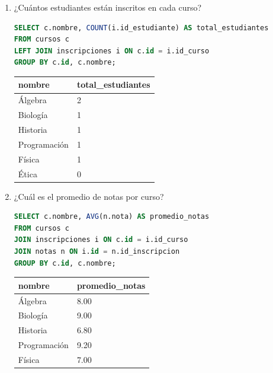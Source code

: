 \documentclass[12pt,letterpaper]{article}
\begin{document}
\begin{enumerate}
    \item ¿Cuántos estudiantes están inscritos en cada curso?
\begin{lstlisting}[language=SQL, frame=single]
SELECT c.nombre, COUNT(i.id_estudiante) AS total_estudiantes 
FROM cursos c 
LEFT JOIN inscripciones i ON c.id = i.id_curso 
GROUP BY c.id, c.nombre;
\end{lstlisting}
    \begin{table}[H]
        \centering
        \begin{tabular}{|l|l|}
        \hline
        \textbf{nombre} & \textbf{total\_estudiantes} \\ \hline
        Álgebra & 2 \\ 
        Biología & 1 \\ 
        Historia & 1 \\ 
        Programación & 1 \\ 
        Física & 1 \\ 
        Ética & 0 \\ \hline
        \end{tabular}
    \end{table}

    \item ¿Cuál es el promedio de notas por curso?
\begin{lstlisting}[language=SQL, frame=single]
SELECT c.nombre, AVG(n.nota) AS promedio_notas 
FROM cursos c 
JOIN inscripciones i ON c.id = i.id_curso 
JOIN notas n ON i.id = n.id_inscripcion 
GROUP BY c.id, c.nombre;
\end{lstlisting}
    \begin{table}[H]
        \centering
        \begin{tabular}{|l|l|}
        \hline
        \textbf{nombre} & \textbf{promedio\_notas} \\ \hline
        Álgebra & 8.00 \\ 
        Biología & 9.00 \\ 
        Historia & 6.80 \\ 
        Programación & 9.20 \\ 
        Física & 7.00 \\ \hline
        \end{tabular}
    \end{table}


\end{enumerate}
\end{document}
